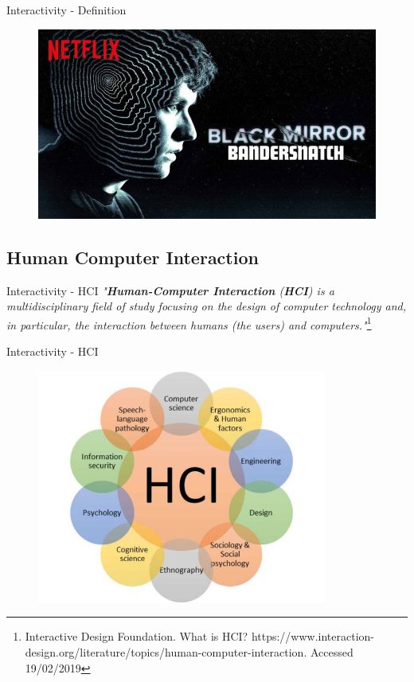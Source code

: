 \documentclass{beamer}
\begin{document}
\begin{frame}{Interactivity - Definition} 
    \begin{figure}[h]
        \includegraphics[width=\textwidth]{bandersnatch.jpg}
    \end{figure}
\end{frame}


\subsection{Human Computer Interaction}

\begin{frame}{Interactivity - HCI} 
   \textit{"\textbf{Human-Computer Interaction} (\textbf{HCI}) is a multidisciplinary field of study focusing on the design of computer technology and, in particular, the interaction between humans (the users) and computers."}\footnote{Interactive Design Foundation. What is HCI? https://www.interaction-design.org/literature/topics/human-computer-interaction. Accessed 19/02/2019}
\end{frame}

\begin{frame}{Interactivity - HCI} 
    \begin{figure}[h]
        \includegraphics[width=0.85\textwidth]{hci.jpg}
    \end{figure}
\end{frame}
\end{document}
